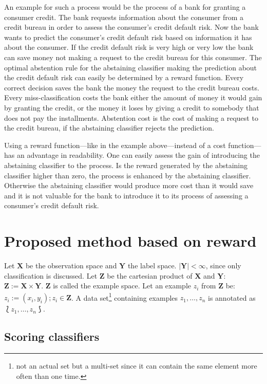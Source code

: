 \documentclass[twoside,11pt]{article}
\def\ds{\Lbag z_1,\dots,z_n \Rbag}
\begin{document}
An example for such a process would be the process of a
bank for granting a consumer credit.
The bank requests information about the consumer from a
credit bureau in order to assess the consumer's credit
default risk.
Now the bank wants to predict the consumer's credit
default risk based on information it has about the
consumer.
If the credit default risk is very high or very low the
bank can save money not making a request to the credit
bureau for this consumer.
The optimal abstention rule for the abstaining classifier
making the prediction about the credit default risk can
easily be determined by a reward function.
Every correct decision saves the bank the money the request
to the credit bureau costs.
Every miss-classification costs the bank either the amount
of money it would gain by granting the credit, or the
money it loses by giving a credit to somebody that does not
pay the installments.
Abstention cost is the cost of making a request to the
credit bureau, if the abstaining classifier rejects the
prediction.

Using a reward function---like in the example
above---instead of a cost function---has an advantage in
readability. One can easily assess the gain of introducing
the abstaining classifier to the process.
Is the reward generated by the abstaining classifier higher
than zero, the process is enhanced by the abstaining
classifier.
Otherwise the abstaining classifier would produce more
cost than it would save and it is not valuable for the
bank to introduce it to its process of assessing a
consumer's credit default risk.

\section{Proposed method based on reward}
\label{sec:method}

Let $\textbf{X}$ be the observation space and $\textbf{Y}$
the label space. $|\textbf{Y}| < \infty$, since only
classification is discussed. Let $\textbf{Z}$ be the
cartesian product of $\textbf{X}$ and $\textbf{Y}$:
$\textbf{Z} := \textbf{X} \times \textbf{Y}$.
$\textbf{Z}$ is called the example space.
Let an example $z_i$ from $\textbf{Z}$ be:
$z_i := (x_i, y_i); z_i \in \textbf{Z}$.
A data set\footnote{not an actual set but a multi-set since
it can contain the same element more often than one time.}
containing examples $z_1,\dots,z_n$ is annotated as
$\ds$.

\subsection{Scoring classifiers}
\end{document}
